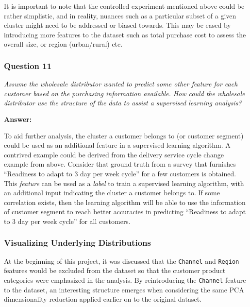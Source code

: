 \documentclass{article}
\begin{document}
It is important to note that the controlled experiment mentioned above
could be rather simplistic, and in reality, nuances such as a particular
subset of a given cluster might need to be addressed or biased towards.
This may be eased by introducing more features to the dataset such as
total purchase cost to assess the overall size, or region (urban/rural)
etc.

    \subsubsection{Question 11}\label{question-11}

\emph{Assume the wholesale distributor wanted to predict some other
feature for each customer based on the purchasing information available.
How could the wholesale distributor use the structure of the data to
assist a supervised learning analysis?}

    \textbf{Answer:}

To aid further analysis, the cluster a customer belongs to (or customer
segment) could be used as an additional feature in a supervised learning
algorithm. A contrived example could be derived from the delivery
service cycle change example from above. Consider that ground truth from
a survey that furnishes ``Readiness to adapt to 3 day per week cycle''
for a few customers is obtained. This \emph{feature} can be used as a
\emph{label} to train a supervised learning algorithm, with an
additional input indicating the cluster a customer belongs to. If some
correlation exists, then the learning algorithm will be able to use the
information of customer segment to reach better accuracies in predicting
``Readiness to adapt to 3 day per week cycle'' for all customers.

    \subsubsection{Visualizing Underlying
Distributions}\label{visualizing-underlying-distributions}

At the beginning of this project, it was discussed that the
\texttt{\textquotesingle{}Channel\textquotesingle{}} and
\texttt{\textquotesingle{}Region\textquotesingle{}} features would be
excluded from the dataset so that the customer product categories were
emphasized in the analysis. By reintroducing the
\texttt{\textquotesingle{}Channel\textquotesingle{}} feature to the
dataset, an interesting structure emerges when considering the same PCA
dimensionality reduction applied earlier on to the original dataset.
\end{document}
